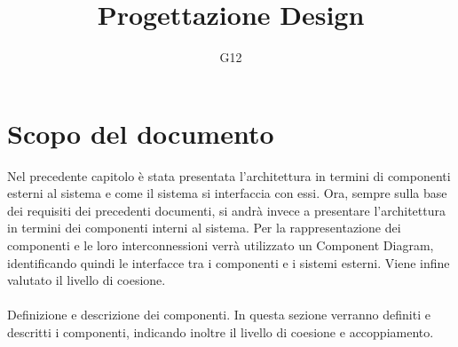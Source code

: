 \documentclass{article}
\author{G12}
\title{Progettazione Design}
\date{}
\begin{document}
      \maketitle
      \tableofcontents
      \clearpage
      \section{Scopo del documento}
      Nel precedente capitolo è stata presentata l'architettura in termini di componenti esterni al sistema e come il sistema si interfaccia con essi. Ora, sempre sulla base dei
      requisiti dei precedenti documenti, si andrà invece a presentare l’architettura in termini dei componenti interni al sistema. Per la rappresentazione dei componenti e le loro
      interconnessioni verrà utilizzato un Component Diagram, identificando quindi le interfacce tra i componenti e i sistemi esterni. Viene infine valutato il livello di coesione.\\
      \\
      Definizione e descrizione dei componenti.
      In questa sezione verranno definiti e descritti i componenti, indicando inoltre il livello di coesione e accoppiamento.
\end{document}
